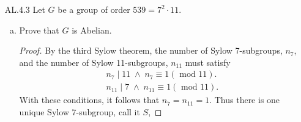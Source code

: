 \documentclass[12pt]{article}
\begin{document}
\begin{enumerate}
\begin{enumerate}[(a)]
\begin{proof}
                        that $\{s_k\}$ is bounded. Then because the terms of
                        $\{a_k\}$ are all nonnegative, then $\{s_k\}$ is
                        a monotone increasing sequence which is bounded above. Thus
                        $\{s_k\}$ is convergent and so $\sum a_k$ converges. 
                    \end{proof}
                \item Let $\alpha=\lim\sup_{n\to\infty}\sqrt[n]{|a_n|}$. Prove
                    that if $\alpha>1$ then $\sum_{n=1}^{\infty}a_n$ diverges. 
                    \begin{proof}
                        We assume that $\alpha<\infty$. If $\alpha>1$, then
                        since $\alpha$ is the limit of some subsequence, 
                        \begin{equation*}
                            \lim_{k\to\infty}\sqrt[n_k]{|a_{n_k}|}=\alpha>1.  
                        \end{equation*}
                        This implies that there are infinitely many terms
                        $\sqrt[n_k]{|a_{n_k}|}>1$ which implies that for
                        infinitely terms $|a_{n_k}|>1$. Thus $\lim_{n\to\infty} a_n>0$
                        which, by contrapositive, implies that $\sum a_k$ does
                        not converge. 
                    \end{proof}
            \end{enumerate}
        \item[AL.4.3] Let $G$ be a group of order $539=7^2\cdot 11$. 
            \begin{enumerate}[(a)]
                \item Prove that $G$ is Abelian. 
                    \begin{proof}
                        By the third Sylow theorem, the number of Sylow
                        7-subgroups, $n_7$, and the number of Sylow
                        11-subgroups, $n_{11}$ must satisfy
                        \begin{align*}
                            &n_7\mid 11\;\land\;n_7\equiv1(\text{ mod  }11). \\
                            &n_{11}\mid 7\;\land\;n_{11}\equiv1(\text{ mod
                            }11).
                        \end{align*}
                        With these conditions, it follows that $n_7=n_{11}=1$.
                        Thus there is one unique Sylow 7-subgroup, call it $S$,

\end{proof}
\end{enumerate}
\end{enumerate}
\end{document}
